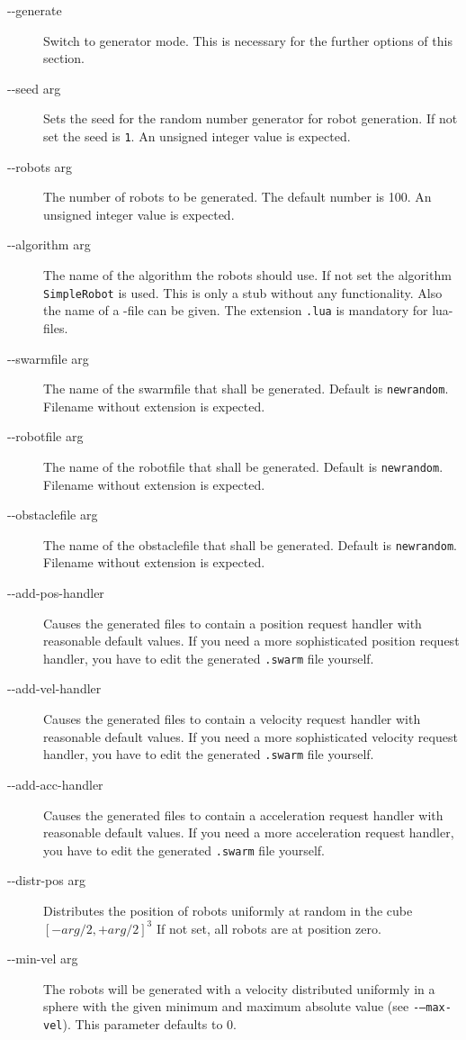 \begin{description}
	\item [-{}-generate] Switch to generator mode. This is necessary for the further options of this section.
	\item [-{}-seed arg] Sets the seed for the random number generator for robot generation. If not set the seed is {\tt 1}. An unsigned integer value is expected.
	\item [-{}-robots arg] The number of robots to be generated. The default number is 100. An unsigned integer value is expected.
	\item [-{}-algorithm arg] The name of the algorithm the robots should use. If not set the algorithm {\tt SimpleRobot} is used. This is only a stub without any functionality. Also the name of a \Lua-file can be given. The extension {\tt .lua} is mandatory for lua-files.
	\item [-{}-swarmfile arg] The name of the swarmfile that shall be generated. Default is {\tt newrandom}. Filename without extension is expected.
	\item [-{}-robotfile arg] The name of the robotfile that shall be generated. Default is {\tt newrandom}. Filename without extension is expected.
	\item [-{}-obstaclefile arg] The name of the obstaclefile that shall be generated. Default is {\tt newrandom}. Filename without extension is expected.
	\item [-{}-add-pos-handler] Causes the generated files to contain a position request handler with reasonable default values. If you need a more sophisticated position request handler, you have to edit the generated {\tt .swarm} file yourself.
	\item [-{}-add-vel-handler] Causes the generated files to contain a velocity request handler with reasonable default values. If you need a more sophisticated velocity request handler, you have to edit the generated {\tt .swarm} file yourself.
	\item [-{}-add-acc-handler] Causes the generated files to contain a acceleration request handler with reasonable default values. If you need a more acceleration request handler, you have to edit the generated {\tt .swarm} file yourself.
	\item [-{}-distr-pos arg] Distributes the position of robots uniformly at random in the cube $[-arg/2,+arg/2]^3$
 If not set, all robots are at position zero.
	\item [-{}-min-vel arg] The robots will be generated with a velocity distributed uniformly in a sphere with the given minimum and maximum absolute value (see {\tt -{}---max-vel}). This parameter defaults to 0.

\end{description}
